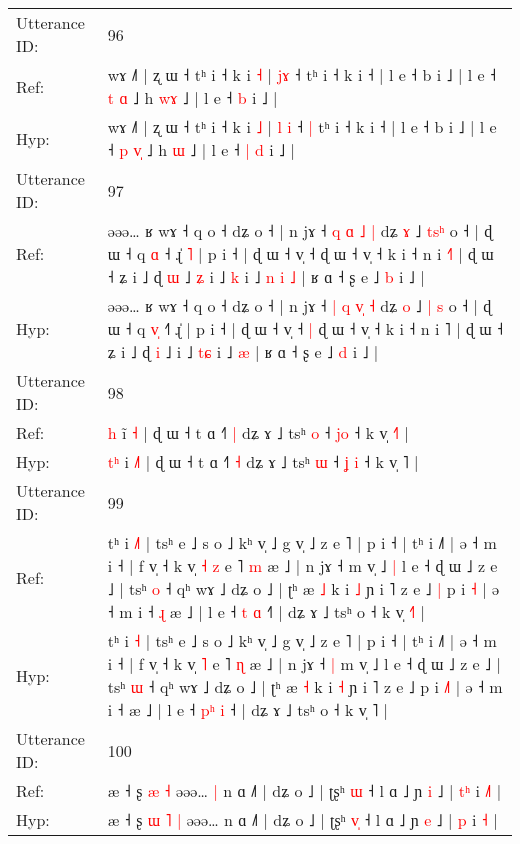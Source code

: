 \documentclass[10pt]{article}
\DeclareRobustCommand{\hl}[1]{{\textcolor{red}{#1}}}
\begin{document}
\begin{longtable}{ll}
\midrule
Utterance ID: & 96 \\
Ref: & wɤ ˩˥ | ʐ ɯ ˧ tʰ i ˧ k i \hl{˧} | \hl{}\hl{j}\hl{ɤ} ˧\hl{}\hl{} tʰ i ˧ k i ˧ | l e ˧ b i ˩ | l e ˧ \hl{t} \hl{}\hl{ɑ} ˩ h \hl{w}\hl{ɤ} ˩ | l e ˧\hl{}\hl{} \hl{b} i ˩ |
 \\
Hyp: & wɤ ˩˥ | ʐ ɯ ˧ tʰ i ˧ k i \hl{˩} | \hl{l}\hl{ }\hl{i} ˧\hl{ }\hl{|} tʰ i ˧ k i ˧ | l e ˧ b i ˩ | l e ˧ \hl{p} \hl{v}\hl{̩} ˩ h \hl{}\hl{ɯ} ˩ | l e ˧\hl{ }\hl{|} \hl{d} i ˩ |
 \\
\midrule
Utterance ID: & 97 \\
Ref: & əəə… ʁ wɤ ˧ q o ˧ dʑ o ˧ | n jɤ ˧ \hl{q} \hl{ɑ} \hl{}\hl{˩} \hl{|} dʑ \hl{ɤ} ˩ \hl{t}\hl{s}\hl{ʰ} o ˧ | ɖ ɯ ˧ q \hl{}\hl{ɑ} ˧\hl{} ɻ̍\hl{ }\hl{˥} | p i ˧ | ɖ ɯ ˧ v̩ ˧\hl{}\hl{} ɖ ɯ ˧ v̩ ˧ k i ˧ n i \hl{˧}˥ | ɖ ɯ ˧ ʑ i ˩ ɖ \hl{ɯ} ˩\hl{ }\hl{ʑ} i ˩ \hl{}\hl{k} i ˩\hl{ }\hl{n}\hl{ }\hl{i} \hl{˩} | ʁ ɑ ˧ ʂ e ˩ \hl{b} i ˩ |
 \\
Hyp: & əəə… ʁ wɤ ˧ q o ˧ dʑ o ˧ | n jɤ ˧ \hl{|} \hl{q} \hl{v}\hl{̩} \hl{˧} dʑ \hl{o} ˩ \hl{|}\hl{ }\hl{s} o ˧ | ɖ ɯ ˧ q \hl{v}\hl{̩} ˧\hl{˥} ɻ̍\hl{}\hl{} | p i ˧ | ɖ ɯ ˧ v̩ ˧\hl{ }\hl{|} ɖ ɯ ˧ v̩ ˧ k i ˧ n i \hl{}˥ | ɖ ɯ ˧ ʑ i ˩ ɖ \hl{i} ˩\hl{}\hl{} i ˩ \hl{t}\hl{ɕ} i ˩\hl{}\hl{}\hl{}\hl{} \hl{æ} | ʁ ɑ ˧ ʂ e ˩ \hl{d} i ˩ |
 \\
\midrule
Utterance ID: & 98 \\
Ref: & \hl{}\hl{h} i\hl{̃}\hl{ }\hl{˧} | ɖ ɯ ˧ t ɑ ˧˥ \hl{|} dʑ ɤ ˩ tsʰ \hl{o} ˧ \hl{}\hl{j}\hl{o} ˧ k v̩ \hl{˧}˥ |
 \\
Hyp: & \hl{t}\hl{ʰ} i\hl{ }\hl{˩}\hl{˥} | ɖ ɯ ˧ t ɑ ˧˥ \hl{˧} dʑ ɤ ˩ tsʰ \hl{ɯ} ˧ \hl{ʝ}\hl{ }\hl{i} ˧ k v̩ \hl{}˥ |
 \\
\midrule
Utterance ID: & 99 \\
Ref: & tʰ i \hl{˩}\hl{˥} | tsʰ e ˩ s o ˩ kʰ v̩ ˩ g v̩ ˩ z e ˥ | p i ˧ | tʰ i ˩˥ | ə ˧ m i ˧ | f v̩ ˧ k v̩\hl{ }\hl{˧} \hl{z} e ˥ \hl{m} æ ˩ | n jɤ ˧\hl{}\hl{} m v̩ ˩\hl{ }\hl{|} l e ˧ ɖ ɯ ˩ z e ˩ | tsʰ \hl{o} ˧ qʰ wɤ ˩ dʑ o ˩ | ʈʰ æ \hl{˩} k i \hl{˩} ɲ i ˥ z e ˩\hl{ }\hl{|} p i \hl{}\hl{˧} | ə ˧ m i ˧\hl{ }\hl{ɻ} æ ˩ | l e ˧ \hl{}\hl{t} \hl{ɑ} ˧\hl{˥} | dʑ ɤ ˩ tsʰ o ˧ k v̩ \hl{˧}˥ |
 \\
Hyp: & tʰ i \hl{}\hl{˧} | tsʰ e ˩ s o ˩ kʰ v̩ ˩ g v̩ ˩ z e ˥ | p i ˧ | tʰ i ˩˥ | ə ˧ m i ˧ | f v̩ ˧ k v̩\hl{}\hl{} \hl{˥} e ˥ \hl{ɳ} æ ˩ | n jɤ ˧\hl{ }\hl{|} m v̩ ˩\hl{}\hl{} l e ˧ ɖ ɯ ˩ z e ˩ | tsʰ \hl{ɯ} ˧ qʰ wɤ ˩ dʑ o ˩ | ʈʰ æ \hl{˧} k i \hl{˧} ɲ i ˥ z e ˩\hl{}\hl{} p i \hl{˩}\hl{˥} | ə ˧ m i ˧\hl{}\hl{} æ ˩ | l e ˧ \hl{p}\hl{ʰ} \hl{i} ˧\hl{} | dʑ ɤ ˩ tsʰ o ˧ k v̩ \hl{}˥ |
 \\
\midrule
Utterance ID: & 100 \\
Ref: & æ ˧ ʂ\hl{}\hl{} \hl{æ} \hl{˧} əəə…\hl{ }\hl{|} n ɑ ˩˥ | dʑ o ˩ | ʈʂʰ \hl{}\hl{ɯ} ˧ l ɑ ˩ ɲ \hl{i} ˩ | \hl{t}\hl{ʰ} i \hl{˩}\hl{˥} |
 \\
Hyp: & æ ˧ ʂ\hl{ }\hl{ɯ} \hl{˥} \hl{|} əəə…\hl{}\hl{} n ɑ ˩˥ | dʑ o ˩ | ʈʂʰ \hl{v}\hl{̩} ˧ l ɑ ˩ ɲ \hl{e} ˩ | \hl{}\hl{p} i \hl{}\hl{˧} |
 \\
\midrule
\end{longtable}
\end{document}
